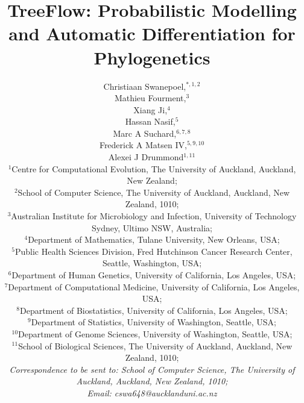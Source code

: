 \documentclass[oupdraft]{sysbio_sse}
\begin{document}


\title{TreeFlow: Probabilistic Modelling and Automatic Differentiation for Phylogenetics
}

\author{Christiaan Swanepoel,$^{\ast, 1, 2}$\\
Mathieu Fourment,$^{3}$\\
Xiang Ji,$^{4}$\\
Hassan Nasif,$^{5}$\\
Marc A Suchard,$^{6,7,8}$\\
Frederick A Matsen IV,$^{5,9,10}$\\
Alexei J Drummond$^{1,11}$
\\[4pt]
    ${^1}$Centre for Computational Evolution, The University of Auckland, Auckland, New Zealand;\\
$^{2}$School of Computer Science, The University of Auckland, Auckland, New Zealand, 1010;\\
$^{3}$Australian Institute for Microbiology and Infection, University of Technology Sydney, Ultimo NSW, Australia;\\
$^{4}$Department of Mathematics, Tulane University, New Orleans, USA;\\
$^{5}$Public Health Sciences Division, Fred Hutchinson Cancer Research Center, Seattle, Washington, USA;\\
$^{6}$Department of Human Genetics, University of California, Los Angeles, USA;\\
$^{7}$Department of Computational Medicine, University of California, Los Angeles, USA;\\
$^{8}$Department of Biostatistics, University of California, Los Angeles, USA;\\
$^{9}$Department of Statistics, University of Washington, Seattle, USA;\\
$^{10}$Department of Genome Sciences, University of Washington, Seattle, USA;\\
$^{11}$School of Biological Sciences, The University of Auckland, Auckland, New Zealand, 1010;\\
 [2pt]
    \textit{Correspondence to be sent to: School of Computer Science, The University of Auckland, Auckland, New Zealand, 1010;\\
Email: cswa648@aucklanduni.ac.nz
}}
\end{document}
